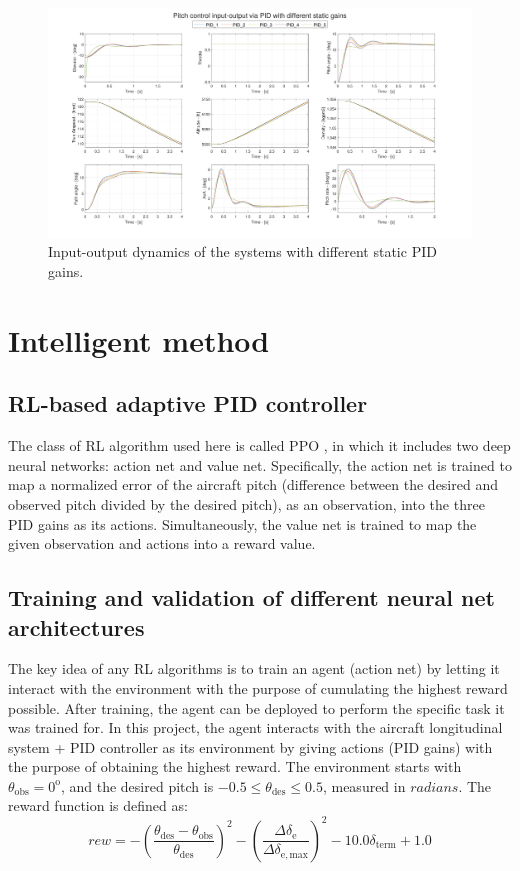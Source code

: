 \documentclass[lettersize,journal]{IEEEtran}
\begin{document}
\begin{figure}[!t]
\centering
\includegraphics[width=7in]{figs/input_output_pids.pdf}%
\caption{Input-output dynamics of the systems with different static PID gains.}
\label{fig:io_pids}
\end{figure}

\section{Intelligent method}
\subsection{RL-based adaptive PID controller}
The class of RL algorithm used here is called PPO \cite{ref13}, in which it includes two deep neural networks: action net and value net. Specifically, the action net is trained to map a normalized error of the aircraft pitch (difference between the desired and observed pitch divided by the desired pitch), as an observation, into the three PID gains as its actions. Simultaneously, the value net is trained to map the given observation and actions into a reward value.

\subsection{Training and validation of different neural net architectures}
The key idea of any RL algorithms is to train an agent (action net) by letting it interact with the environment with the purpose of cumulating the highest reward possible. After training, the agent can be deployed to perform the specific task it was trained for. In this project, the agent interacts with the aircraft longitudinal system + PID controller as its environment by giving actions (PID gains) with the purpose of obtaining the highest reward. The environment starts with $\theta_{\mathrm{obs}}=0^\mathrm{o}$, and the desired pitch is $-0.5\leq\theta_{\mathrm{des}}\leq0.5$, measured in $radians$. The reward function is defined as:
\begin{equation}\label{eq:reward_function}
rew = - \left(\frac{\theta_{\mathrm{des}}-\theta_{\mathrm{obs}}}{\theta_{\mathrm{des}}}\right)^2 - \left(\frac{\Delta\delta_{\mathrm{e}}}{\Delta\delta_{\mathrm{e,max}}}\right)^2 - 10.0\delta_{\mathrm{term}} + 1.0
\end{equation}
\end{document}
